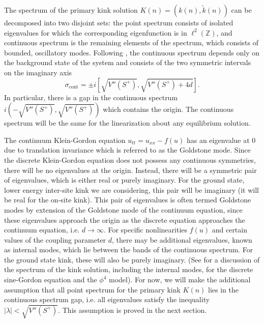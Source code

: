 \documentclass[12pt,reqno]{amsart}
\def\Z{{\mathbb Z}}
\begin{document}
The spectrum of the primary kink solution $K(n) = (k(n),\tilde{k}(n))$ can be decomposed into two disjoint sets: the point spectrum consists of isolated eigenvalues for which the corresponding eigenfunction is in $\ell^2(\Z)$, and continuous spectrum is the remaining elements of the spectrum, which consists of bounded, oscillatory modes. Following \cite{KevrekidisWeinstein2000}, the continuous spectrum depends only on the background state of the system and consists of the two symmetric intervals on the imaginary axis
\begin{equation}\label{eq:contspec}
	\sigma_{\text{cont}} = \pm i \left[\sqrt{V''(S^+)}, \sqrt{V''(S^+) + 4d}\right].
\end{equation}
In particular, there is a gap in the continuous spectrum $i\left(-\sqrt{V''(S^+)},\sqrt{V''(S^+)}\right)$ which contains the origin. The continuous spectrum will be the same for the linearization about any equilibrium solution. 

The continuum Klein-Gordon equation $u_{tt} = u_{xx} - f(u)$ has an eigenvalue at 0 due to translation invariance which is referred to as the Goldstone mode. Since the discrete Klein-Gordon equation does not possess any continuous symmetries, there will be no eigenvalues at the origin. Instead, there will be a symmetric pair of eigenvalues, which is either real or purely imaginary. For the ground state, lower energy inter-site kink we are considering, this pair will be imaginary (it will be real for the on-site kink). This pair of eigenvalues is often termed Goldstone modes by extension of the Goldstone mode of the continuum equation, since these eigenvalues approach the origin as the discrete equation approaches the continuum equation, i.e. $d \rightarrow \infty$. For specific nonlinearities $f(u)$ and certain values of the coupling parameter $d$, there may be additional eigenvalues, known as internal modes, which lie between the bands of the continuous spectrum. For the ground state kink, these will also be purely imaginary. (See \cite{cretegny,KevrekidisWeinstein2000}
for a discussion of the spectrum of the kink solution, including the internal modes, for the discrete sine-Gordon equation and the $\phi^4$ model). For now, we will make the additional assumption that all point spectrum for the primary kink $K(n)$ lies in the continuous spectrum gap, i.e. all eigenvalues satisfy the inequality $|\lambda| < \sqrt{V''(S^+)}$. This assumption is proved in the next section.
\end{document}
